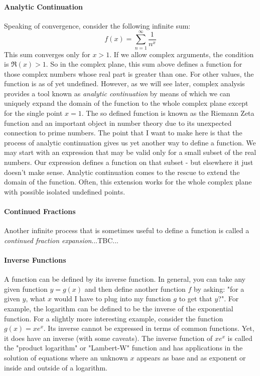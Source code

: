 \paragraph{Analytic Continuation}
Speaking of convergence, consider the following infinite sum:
\begin{equation}
	f(x) = \sum_{n=1}^\infty \frac{1}{n^x}
\end{equation}
This sum converges only for $x > 1$. If we allow complex arguments, the condition is $\Re(x) > 1$. So in the complex plane, this sum above defines a function for those complex numbers whose real part is greater than one. For other values, the function is as of yet undefined. However, as we will see later, complex analysis provides a tool known as \emph{analytic continuation} by means of which we can uniquely expand the domain of the function to the whole complex plane except for the single point $x=1$. The so defined function is known as the Riemann Zeta function and an important object in number theory due to its unexpected connection to prime numbers. The point that I want to make here is that the process of analytic continuation gives us yet another way to define a function. We may start with an expression that may be valid only for a small subset of the real numbers. Our expression defines a function on that subset - but elsewhere it just doesn't make sense. Analytic continuation comes to the rescue to extend the domain of the function. Often, this extension works for the whole complex plane with possible isolated undefined points.

\paragraph{Continued Fractions}
Another infinite process that is sometimes useful to define a function is called a \emph{continued fraction expansion}...TBC...

\paragraph{Inverse Functions}
A function can be defined by its inverse function. In general, you can take any given function $y = g(x)$ and then define another function $f$ by asking: "for a given $y$, what $x$ would I have to plug into my function $g$ to get that $y$?". For example, the logarithm can be defined to be the inverse of the exponential function. For a slightly more interesting example, consider the function $g(x) = x e^x$. Its inverse cannot be expressed in terms of common functions. Yet, it does have an inverse (with some caveats). The inverse function of $x e^x$ is called the "product logarithm" or "Lambert-W" function and has applications in the solution of equations where an unknown $x$ appears as base and as exponent or inside and outside of a logarithm.

